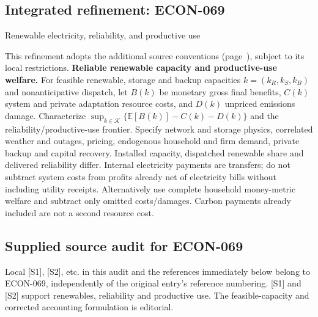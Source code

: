 \documentclass[11pt,a4paper]{article}
\begin{document}
\subsection*{Integrated refinement: ECON-069}
{\sffamily\small\color{muted}Renewable electricity, reliability, and productive use\par}
This refinement adopts the additional source conventions
(page~\pageref{audited:conventions}), subject to its local restrictions.
\textbf{Reliable renewable capacity and productive-use welfare.}
For feasible renewable, storage and backup capacities $k=(k_R,k_S,k_B)$ and
nonanticipative dispatch, let $B(k)$ be monetary gross final benefits,
$C(k)$ system and private adaptation resource costs, and $D(k)$ unpriced emissions
damage. Characterize $\sup_{k\in\mathcal K}\{\mathbb E[B(k)]-C(k)-D(k)\}$ and
the reliability/productive-use frontier. Specify network and storage physics,
correlated weather and outages, pricing, endogenous household and firm demand,
private backup and capital recovery. Installed capacity, dispatched renewable
share and delivered reliability differ. Internal electricity payments are
transfers; do not subtract system costs from profits already net of electricity
bills without including utility receipts. Alternatively use complete household
money-metric welfare and subtract only omitted costs/damages. Carbon payments
already included are not a second resource cost.
\subsection*{Supplied source audit for ECON-069}
Local [S1], [S2], etc. in this audit and the references immediately below
belong to ECON-069, independently of the original entry's reference numbering.
[S1] and [S2] support renewables, reliability and productive use. The feasible-capacity and corrected accounting formulation is editorial.
\end{document}
